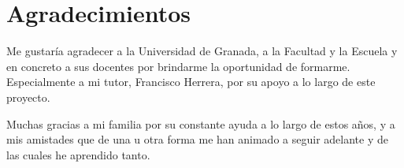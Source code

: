 




\begingroup
\let\clearpage\relax
\let\cleardoublepage\relax
\let\cleardoublepage\relax
\chapter*{Agradecimientos}

Me gustaría agradecer a la Universidad de Granada, a la Facultad y la Escuela y en concreto a sus docentes por brindarme la oportunidad de formarme. Especialmente a mi tutor, Francisco Herrera, por su apoyo a lo largo de este proyecto.

Muchas gracias a mi familia por su constante ayuda a lo largo de estos años, y a mis amistades que de una u otra forma me han animado a seguir adelante y de las cuales he aprendido tanto.

\endgroup
